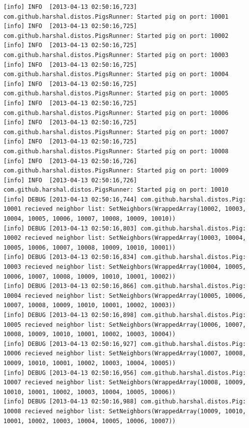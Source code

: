 \documentclass[]{article}
\begin{document}
\tiny\begin{verbatim}
[info] INFO  [2013-04-13 02:50:16,723] com.github.harshal.distos.PigsRunner: Started pig on port: 10001
[info] INFO  [2013-04-13 02:50:16,725] com.github.harshal.distos.PigsRunner: Started pig on port: 10002
[info] INFO  [2013-04-13 02:50:16,725] com.github.harshal.distos.PigsRunner: Started pig on port: 10003
[info] INFO  [2013-04-13 02:50:16,725] com.github.harshal.distos.PigsRunner: Started pig on port: 10004
[info] INFO  [2013-04-13 02:50:16,725] com.github.harshal.distos.PigsRunner: Started pig on port: 10005
[info] INFO  [2013-04-13 02:50:16,725] com.github.harshal.distos.PigsRunner: Started pig on port: 10006
[info] INFO  [2013-04-13 02:50:16,725] com.github.harshal.distos.PigsRunner: Started pig on port: 10007
[info] INFO  [2013-04-13 02:50:16,725] com.github.harshal.distos.PigsRunner: Started pig on port: 10008
[info] INFO  [2013-04-13 02:50:16,726] com.github.harshal.distos.PigsRunner: Started pig on port: 10009
[info] INFO  [2013-04-13 02:50:16,726] com.github.harshal.distos.PigsRunner: Started pig on port: 10010
[info] DEBUG [2013-04-13 02:50:16,744] com.github.harshal.distos.Pig: 10001 recieved neighbor list: SetNeighbors(WrappedArray(10002, 10003, 10004, 10005, 10006, 10007, 10008, 10009, 10010))
[info] DEBUG [2013-04-13 02:50:16,803] com.github.harshal.distos.Pig: 10002 recieved neighbor list: SetNeighbors(WrappedArray(10003, 10004, 10005, 10006, 10007, 10008, 10009, 10010, 10001))
[info] DEBUG [2013-04-13 02:50:16,834] com.github.harshal.distos.Pig: 10003 recieved neighbor list: SetNeighbors(WrappedArray(10004, 10005, 10006, 10007, 10008, 10009, 10010, 10001, 10002))
[info] DEBUG [2013-04-13 02:50:16,866] com.github.harshal.distos.Pig: 10004 recieved neighbor list: SetNeighbors(WrappedArray(10005, 10006, 10007, 10008, 10009, 10010, 10001, 10002, 10003))
[info] DEBUG [2013-04-13 02:50:16,898] com.github.harshal.distos.Pig: 10005 recieved neighbor list: SetNeighbors(WrappedArray(10006, 10007, 10008, 10009, 10010, 10001, 10002, 10003, 10004))
[info] DEBUG [2013-04-13 02:50:16,927] com.github.harshal.distos.Pig: 10006 recieved neighbor list: SetNeighbors(WrappedArray(10007, 10008, 10009, 10010, 10001, 10002, 10003, 10004, 10005))
[info] DEBUG [2013-04-13 02:50:16,956] com.github.harshal.distos.Pig: 10007 recieved neighbor list: SetNeighbors(WrappedArray(10008, 10009, 10010, 10001, 10002, 10003, 10004, 10005, 10006))
[info] DEBUG [2013-04-13 02:50:16,988] com.github.harshal.distos.Pig: 10008 recieved neighbor list: SetNeighbors(WrappedArray(10009, 10010, 10001, 10002, 10003, 10004, 10005, 10006, 10007))

\end{verbatim}
\end{document}
